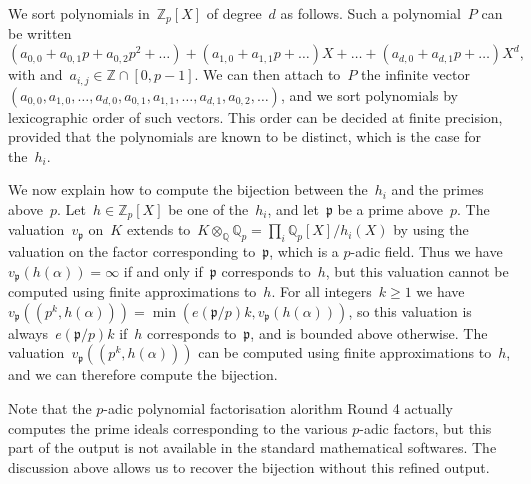 \documentclass{article}
\def\Z{{\mathbb Z}}
\def\Q{{\mathbb Q}}
\def\p{{\mathfrak p}}
\DeclareMathOperator{\disc}{disc}
\begin{document}
We sort polynomials in~$\Z_p[X]$ of degree~$d$ as follows. Such a polynomial~$P$
can be written
\[
  (a_{0,0}+a_{0,1}p+a_{0,2}p^2+\dots) + (a_{1,0}+a_{1,1}p+\dots)X
  + \dots + (a_{d,0}+a_{d,1}p+\dots)X^d,
\]
with and~$a_{i,j}\in\Z\cap[0,p-1]$. We can then attach to~$P$ the infinite
vector~$(a_{0,0},a_{1,0},\dots,a_{d,0},a_{0,1},a_{1,1},\dots,a_{d,1},a_{0,2},\dots)$,
and we sort polynomials by lexicographic order of such vectors. This order can
be decided at finite precision, provided that the polynomials are known to be
distinct, which is the case for the~$h_i$.


We now explain how to compute the bijection between the~$h_i$ and the primes
above~$p$. Let~$h\in\Z_p[X]$ be one of the~$h_i$, and let~$\p$ be a prime
above~$p$. The valuation~$v_{\p}$ on~$K$ extends to~$K\otimes_{\Q}\Q_p = \prod_i
\Q_p[X]/h_i(X)$ by using the valuation on the factor corresponding to~$\p$,
which is a $p$-adic field. Thus we have~$v_{\p}(h(\alpha)) = \infty$ if and only
if~$\p$ corresponds to~$h$, but this valuation cannot be computed using finite
approximations to~$h$. For all integers~$k\ge 1$ we have~$v_\p((p^k,h(\alpha)))
= \min(e(\p/p)k, v_\p(h(\alpha)))$, so this valuation is always~$e(\p/p)k$
if~$h$ corresponds to~$\p$, and is bounded above otherwise. The
valuation~$v_\p((p^k,h(\alpha)))$ can be computed using finite approximations
to~$h$, and we can therefore compute the bijection.

Note that the $p$-adic polynomial factorisation alorithm Round 4 actually
computes the prime ideals corresponding to the various $p$-adic factors, but
this part of the output is not available in the standard mathematical softwares.
The discussion above allows us to recover the bijection without this refined
output.
\end{document}
